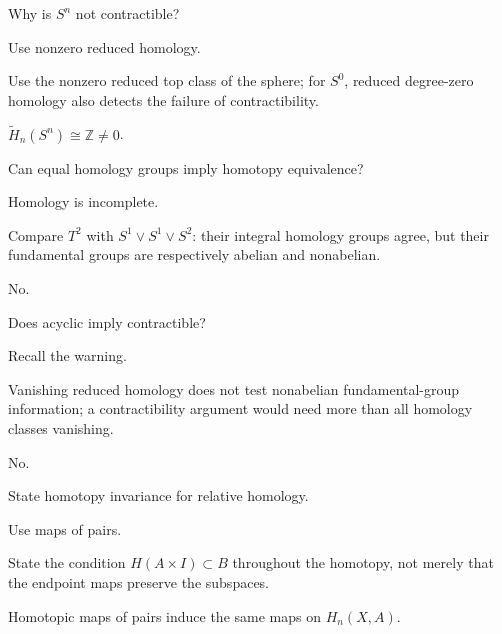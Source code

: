 \begin{exercise}\label{exr:viii20-16}
Why is \(S^n\) not contractible?
\end{exercise}
\begin{hint}
Use nonzero reduced homology.

Use the nonzero reduced top class of the sphere; for \(S^0\), reduced degree-zero homology also detects the failure of contractibility.
\end{hint}
\begin{solution}
\(\widetilde H_n(S^n)\cong\mathbb Z\ne0\).
\end{solution}

\begin{exercise}\label{exr:viii20-17}
Can equal homology groups imply homotopy equivalence?
\end{exercise}
\begin{hint}
Homology is incomplete.

Compare \(T^2\) with \(S^1\vee S^1\vee S^2\): their integral homology groups agree, but their fundamental groups are respectively abelian and nonabelian.
\end{hint}
\begin{solution}
No.
\end{solution}

\begin{exercise}\label{exr:viii20-18}
Does acyclic imply contractible?
\end{exercise}
\begin{hint}
Recall the warning.

Vanishing reduced homology does not test nonabelian fundamental-group information; a contractibility argument would need more than all homology classes vanishing.
\end{hint}
\begin{solution}
No.
\end{solution}

\begin{exercise}\label{exr:viii20-19}
State homotopy invariance for relative homology.
\end{exercise}
\begin{hint}
Use maps of pairs.

State the condition \(H(A\times I)\subset B\) throughout the homotopy, not merely that the endpoint maps preserve the subspaces.
\end{hint}
\begin{solution}
Homotopic maps of pairs induce the same maps on \(H_n(X,A)\).
\end{solution}

